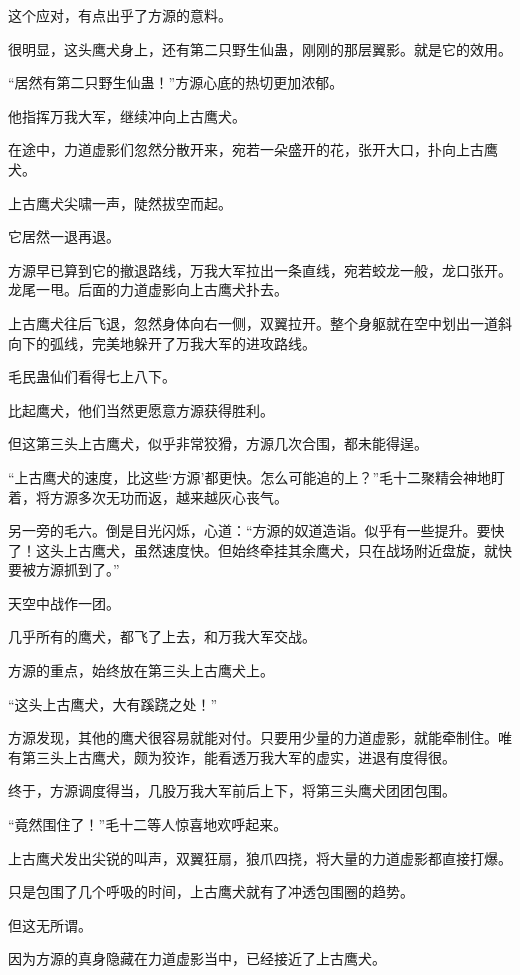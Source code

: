 \begin{this_body}
这个应对，有点出乎了方源的意料。

很明显，这头鹰犬身上，还有第二只野生仙蛊，刚刚的那层翼影。就是它的效用。

“居然有第二只野生仙蛊！”方源心底的热切更加浓郁。

他指挥万我大军，继续冲向上古鹰犬。

在途中，力道虚影们忽然分散开来，宛若一朵盛开的花，张开大口，扑向上古鹰犬。

上古鹰犬尖啸一声，陡然拔空而起。

它居然一退再退。

方源早已算到它的撤退路线，万我大军拉出一条直线，宛若蛟龙一般，龙口张开。龙尾一甩。后面的力道虚影向上古鹰犬扑去。

上古鹰犬往后飞退，忽然身体向右一侧，双翼拉开。整个身躯就在空中划出一道斜向下的弧线，完美地躲开了万我大军的进攻路线。

毛民蛊仙们看得七上八下。

比起鹰犬，他们当然更愿意方源获得胜利。

但这第三头上古鹰犬，似乎非常狡猾，方源几次合围，都未能得逞。

“上古鹰犬的速度，比这些‘方源’都更快。怎么可能追的上？”毛十二聚精会神地盯着，将方源多次无功而返，越来越灰心丧气。

另一旁的毛六。倒是目光闪烁，心道：“方源的奴道造诣。似乎有一些提升。要快了！这头上古鹰犬，虽然速度快。但始终牵挂其余鹰犬，只在战场附近盘旋，就快要被方源抓到了。”

天空中战作一团。

几乎所有的鹰犬，都飞了上去，和万我大军交战。

方源的重点，始终放在第三头上古鹰犬上。

“这头上古鹰犬，大有蹊跷之处！”

方源发现，其他的鹰犬很容易就能对付。只要用少量的力道虚影，就能牵制住。唯有第三头上古鹰犬，颇为狡诈，能看透万我大军的虚实，进退有度得很。

终于，方源调度得当，几股万我大军前后上下，将第三头鹰犬团团包围。

“竟然围住了！”毛十二等人惊喜地欢呼起来。

上古鹰犬发出尖锐的叫声，双翼狂扇，狼爪四挠，将大量的力道虚影都直接打爆。

只是包围了几个呼吸的时间，上古鹰犬就有了冲透包围圈的趋势。

但这无所谓。

因为方源的真身隐藏在力道虚影当中，已经接近了上古鹰犬。


\end{this_body}
